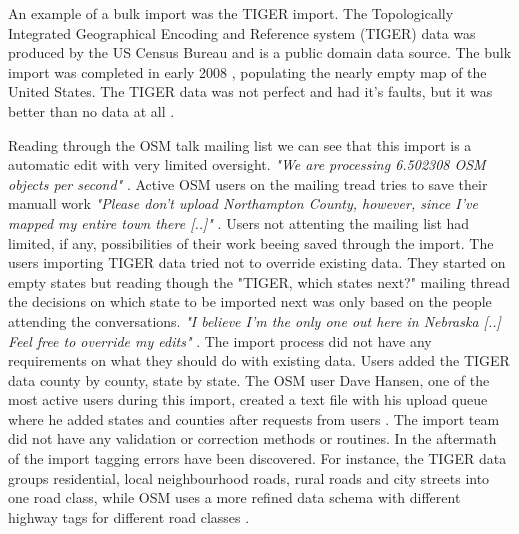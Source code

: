 An example of a bulk import was the TIGER import. The Topologically Integrated Geographical Encoding and Reference system (TIGER) data was produced by the US Census Bureau and is a public domain data source. The bulk import was completed in early 2008 \cite{Zielstra2013}, populating the nearly empty map of the United States. The TIGER data was not perfect and had it's faults, but it was better than no data at all \cite{Willis2008}. 

Reading through the OSM talk mailing list we can see that this import is a automatic edit with very limited oversight. \textit{"We are processing 6.502308 OSM objects per second"} \cite{ Munro2007}. Active OSM users on the mailing tread tries to save their manuall work \textit{"Please don't upload Northampton County, however, since I've mapped my entire town there [..]"} \cite{Mielczarek2007}. Users not attenting the mailing list had limited, if any, possibilities of their work beeing saved through the import. The users importing TIGER data tried not to override existing data. They started on empty states but reading though the "TIGER, which states next?" mailing thread the decisions on which state to be imported next was only based on the people attending the conversations. \textit{"I believe I'm the only one out here in Nebraska [..] Feel free to override my edits"} \cite{Bishop2007}. The import process did not have any requirements on what they should do with existing data. Users added the TIGER data county by county, state by state. The OSM user Dave Hansen, one of the most active users during this import, created a text file with his upload queue \cite{Hansen2007a} where he added states and counties after requests from users \cite{Hansen2007}\cite{Hansen2007b}. The import team did not have any validation or correction methods or routines. In the aftermath of the import tagging errors have been discovered. For instance, the TIGER data groups residential, local neighbourhood roads, rural roads and city streets into one road class, while OSM uses a more refined data schema with different highway tags for different road classes \cite{Zielstra2013}.

